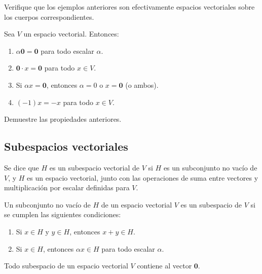 \begin{ejer}
Verifique que los ejemplos anteriores son efectivamente espacios vectoriales sobre los cuerpos correspondientes.
\end{ejer}



\begin{thm}
Sea $V$ un espacio vectorial. Entonces:

\begin{enumerate}
\item
$\alpha \textbf{0} = \textbf{0}$ para todo escalar $\alpha$.

\item
$\textbf{0} \cdot x = \textbf{0}$ para todo $x \in V$.

\item
Si $\alpha x = \textbf{0}$, entonces $\alpha = 0$ o $x = \textbf{0}$ (o ambos).

\item
$(-1)x = -x$ para todo $x \in V$.
\end{enumerate}
\end{thm}
\begin{ejer}
Demuestre las propiedades anteriores.
\end{ejer}
\subsection{Subespacios vectoriales}
\begin{defin}
Se dice que $H$ es un subespacio vectorial de $V$ si $H$ es un subconjunto no vacío de $V$, y $H$ es un espacio vectorial, junto con las operaciones de suma entre vectores y multiplicación por escalar definidas para $V$.
\end{defin}

\begin{thm}
Un subconjunto no vacío de $H$ de un espacio vectorial $V$ es un subespacio de $V$ si se cumplen las siguientes condiciones:

\begin{enumerate}
\item
Si $x \in H$ y $y \in H$, entonces $x + y \in H$.

\item
Si $x \in H$, entonces $\alpha x \in H$ para todo escalar $\alpha$.
\end{enumerate}
\end{thm}

\begin{rmk}
Todo subespacio de un espacio vectorial $V$ contiene al vector $\textbf{0}$.
\end{rmk}

